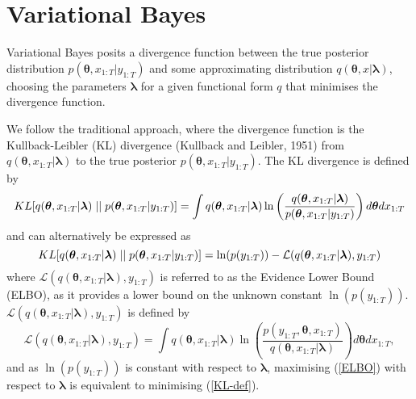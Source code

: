 \documentclass[12pt,a4paper]{article}%
\numberwithin{equation}{section}
\begin{document}
\section{Variational Bayes}
\label{VB}

Variational Bayes posits a divergence function between the true posterior distribution $p(\boldsymbol{\theta}, x_{1:T} | y_{1:T})$ and some approximating distribution $q(\boldsymbol{\theta}, x | \boldsymbol{\lambda})$, choosing the parameters $\boldsymbol{\lambda}$ for a given functional form $q$ that minimises the divergence function.

We follow the traditional approach, where the divergence function is the Kullback-Leibler (KL) divergence (Kullback and Leibler, 1951) from $q(\boldsymbol{\theta}, x_{1:T}| \boldsymbol{\lambda})$ to the true posterior $p(\boldsymbol{\theta}, x_{1:T} | y_{1:T})$. The KL divergence is defined by
\begin{equation}
\label{KL-def}
KL[q(\boldsymbol{\theta}, x_{1:T} | \boldsymbol{\lambda})\hspace{.1cm}||\hspace{.1cm}p(\boldsymbol{\theta}, x_{1:T} | y_{1:T})] = \int q(\boldsymbol{\theta}, x_{1:T} | \boldsymbol{\lambda}) \ln \left( \frac{q(\boldsymbol{\theta}, x_{1:T} | \boldsymbol{\lambda})}{p(\boldsymbol{\theta}, x_{1:T} |y_{1:T})}\right) d\boldsymbol{\theta} dx_{1:T}
\end{equation}
and can alternatively be expressed as
\begin{equation}
\label{KL-ELBO}
KL[q(\boldsymbol{\theta}, x_{1:T} | \boldsymbol{\lambda})\hspace{.1cm}||\hspace{.1cm}p(\boldsymbol{\theta}, x_{1:T} | y_{1:T})] = \ln(p(y_{1:T})) - \mathcal{L}(q(\boldsymbol{\theta}, x_{1:T} | \boldsymbol{\lambda}), y_{1:T})
\end{equation}
where $\mathcal{L}(q(\boldsymbol{\theta}, x_{1:T} | \boldsymbol{\lambda}), y_{1:T})$ is referred to as the Evidence Lower Bound (ELBO), as it provides a lower bound on the unknown constant $\ln(p(y_{1:T}))$.  $\mathcal{L}(q(\boldsymbol{\theta}, x_{1:T} | \boldsymbol{\lambda}), y_{1:T})$ is defined by
\begin{equation}
\label{ELBO}
\mathcal{L}(q(\boldsymbol{\theta}, x_{1:T} | \boldsymbol{\lambda}), y_{1:T}) = \int q(\boldsymbol{\theta}, x_{1:T} | \boldsymbol{\lambda}) \ln \left( \frac{p(y_{1:T},\boldsymbol{\theta}, x_{1:T})}{q(\boldsymbol{\theta}, x_{1:T} | \boldsymbol{\lambda})} \right) d\boldsymbol{\theta}dx_{1:T},
\end{equation}
and as $\ln(p(y_{1:T}))$ is constant with respect to $\boldsymbol{\lambda}$, maximising (\ref{ELBO}) with respect to $\boldsymbol{\lambda}$ is equivalent to minimising (\ref{KL-def}). 
\end{document}
